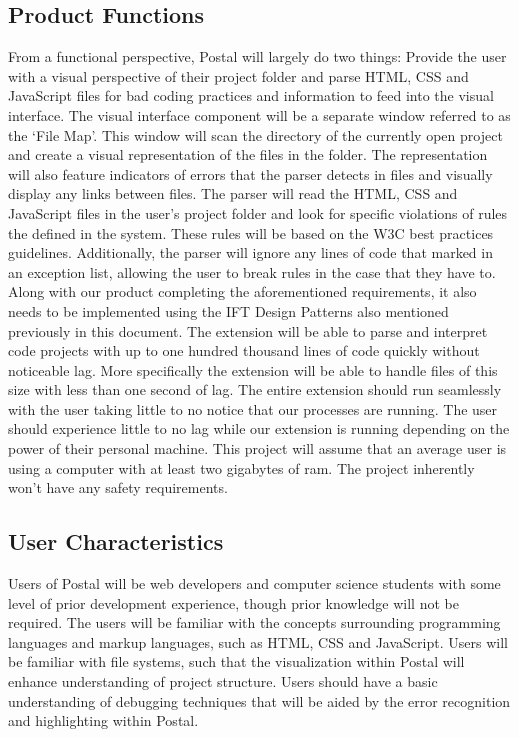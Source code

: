 \documentclass[letterpaper,10pt,titlepage,draftclsnofoot,onecolumn,onesided] {IEEEtran}
\begin{document}
\subsection{Product Functions}
From a functional perspective, Postal will largely do two things: Provide the user with a visual perspective of their project folder and parse HTML, CSS and JavaScript files for bad coding practices and information to feed into the visual interface. 
The visual interface component will be a separate window referred to as the `File Map'.
This window will scan the directory of the currently open project and create a visual representation of the files in the folder.
The representation will also feature indicators of errors that the parser detects in files and visually display any links between files.
The parser will read the HTML, CSS and JavaScript files in the user's project folder and look for specific violations of rules the defined in the system.
These rules will be based on the W3C best practices guidelines.
Additionally, the parser will ignore any lines of code that marked in an exception list, allowing the user to break rules in the case that they have to.
Along with our product completing the aforementioned requirements, it also needs to be implemented using the IFT Design Patterns also mentioned previously in this document.
The extension will be able to parse and interpret code projects with up to one hundred thousand lines of code quickly without noticeable lag. 
More specifically the extension will be able to handle files of this size with less than one second of lag.
The entire extension should run seamlessly with the user taking little to no notice that our processes are running. 
The user should experience little to no lag while our extension is running depending on the power of their personal machine.
This project will assume that an average user is using a computer with at least two gigabytes of ram. 
The project inherently won't have any safety requirements. 

\subsection{User Characteristics}
Users of Postal will be web developers and computer science students with some level of prior development experience, though prior knowledge will not be required. 
The users will be familiar with the concepts surrounding programming languages and markup languages, such as HTML, CSS and JavaScript. 
Users will be familiar with file systems, such that the visualization within Postal will enhance understanding of project structure. 
Users should have a basic understanding of debugging techniques that will be aided by the error recognition and highlighting within Postal.
\end{document}

